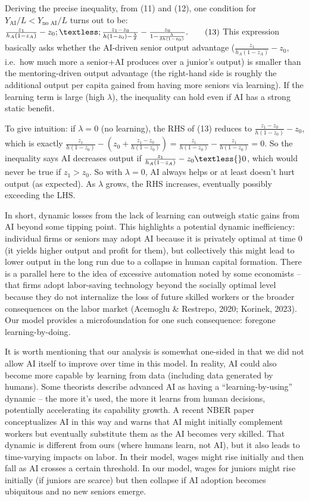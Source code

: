 \documentclass[12pt]{article}
\begin{document}
Deriving the precise inequality, from (11) and (12), one condition for
\(Y_{\text{AI}}/L < Y_{\text{no AI}}/L\) turns out to be: $
\frac{z_1}{h_A(1-z_A)} - z_0 ;\textless;
\frac{z_1 - z_0}{h(1-z_0) - \frac{\lambda}{\delta}} -
\frac{z_0}{1 - \frac{\lambda}{\delta h(1-z_0)}}. \tag{13}$ This
expression basically asks whether the {AI-driven senior output
advantage} (\(\frac{z_1}{h_A(1-z_A)} - z_0\), i.e.~how much more a
senior+AI produces over a junior's output) is smaller than the
{mentoring-driven output advantage} (the right-hand side is
roughly the additional output per capita gained from having more seniors
via learning). If the learning term is large (high \(\lambda\)), the
inequality can hold even if AI has a strong static benefit.

To give intuition: if \(\lambda = 0\) (no learning), the RHS of (13)
reduces to \(\frac{z_1 - z_0}{h(1-z_0)} - z_0\), which is exactly $
\frac{z_1}{h(1-z_0)} - (z_0 + \frac{z_1 - z_0}{h(1-z_0)}) =
\frac{z_1}{h(1-z_0)} - \frac{z_1}{h(1-z_0)} = 0$. So the inequality
says AI decreases output if $ \frac{z_1}{h_A(1-z_A)} - z_0 \textless{}
0$, which would {never} be true if \(z_1 > z_0\). So with
\(\lambda=0\), AI always helps or at least doesn't hurt output (as
expected). As \(\lambda\) grows, the RHS increases, eventually possibly
exceeding the LHS.

In short, {dynamic losses from the lack of learning can outweigh
static gains from AI} beyond some tipping point. This highlights a
potential {dynamic inefficiency}: individual firms or seniors may
adopt AI because it is privately optimal at time 0 (it yields higher
output and profit for them), but collectively this might lead to lower
output in the long run due to a collapse in human capital formation.
There is a parallel here to the idea of {excessive automation}
noted by some economists -- that firms adopt labor-saving technology
beyond the socially optimal level because they do not internalize the
loss of future skilled workers or the broader consequences on the labor
market (Acemoglu \& Restrepo, 2020; Korinek, 2023). Our model provides a
microfoundation for one such consequence: {foregone
learning-by-doing}.

It is worth mentioning that our analysis is somewhat one-sided in that
{we did not allow AI itself to improve} over time in this model.
In reality, AI could also become more capable by learning from data
(including data generated by humans). Some theorists describe advanced
AI as having a ``learning-by-using'' dynamic -- the more it's used, the
more it learns from human decisions, potentially {accelerating} its
capability growth. A recent NBER paper conceptualizes AI in this way and
warns that AI might initially complement workers but eventually
substitute them as the AI becomes very skilled. That dynamic is
different from ours (where humans learn, not AI), but it also leads to
time-varying impacts on labor. In their model, wages might rise
initially and then fall as AI crosses a certain threshold. In our model,
wages for juniors might rise initially (if juniors are scarce) but then
collapse if AI adoption becomes ubiquitous and no new seniors emerge.
\end{document}
